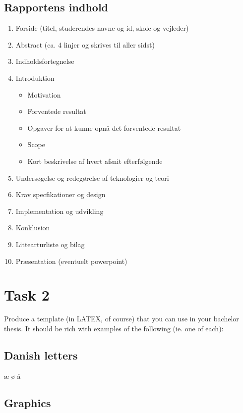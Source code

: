 \documentclass{article}
\begin{document}
        \subsection*{Rapportens indhold}
        \begin{enumerate}
            \item Forside (titel, studerendes navne og id, skole og vejleder)
            \item Abstract (ca. 4 linjer og skrives til aller sidst)
            \item Indholdsfortegnelse 
            \item Introduktion
            \begin{itemize}
                \item Motivation
                \item Forventede resultat
                \item Opgaver for at kunne opnå det forventede resultat
                \item Scope
                \item Kort beskrivelse af hvert afsnit efterfølgende
            \end{itemize}
            \item Undersøgelse og redegørelse af teknologier og teori
            \item Krav specfikationer og design
            \item Implementation og udvikling 
            \item Konklusion
            \item Littearturliste og bilag 
            \item Præsentation (eventuelt powerpoint)
        \end{enumerate}
    
      

\newpage
    \section{Task 2}

    Produce a template (in LATEX, of course) that you can use in your bachelor
    thesis. It should be rich with examples of the following (ie. one of each):

        \subsection{Danish letters}
            æ ø å

        \subsection{Graphics}
\end{document}
